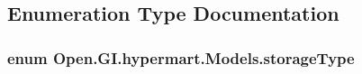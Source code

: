 \subsection{Enumeration Type Documentation}
\hypertarget{namespace_open_1_1_g_i_1_1hypermart_1_1_models_a21c5ffa7da75ad8a6d2b04798113f9db}{}
\subsubsection[{storage\+Type}]{\setlength{\rightskip}{0pt plus 5cm}enum {\bf Open.\+G\+I.\+hypermart.\+Models.\+storage\+Type}\hspace{0.3cm}{\ttfamily [strong]}}\label{namespace_open_1_1_g_i_1_1hypermart_1_1_models_a21c5ffa7da75ad8a6d2b04798113f9db}
